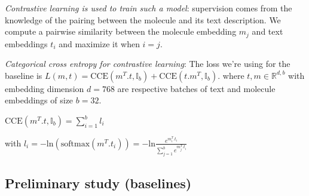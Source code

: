 \textit{Contrastive learning is used to train such a model}: supervision comes from the knowledge of the pairing between the molecule and its text description. We compute a pairwise similarity between the molecule embedding $m_{j}$ and text embeddings $t_{i}$ and maximize it when $i=j$. 

\textit{Categorical cross entropy for contrastive learning}: The loss we're using for the baseline is $L(m, t) = \text{CCE}(m^{T}.t , \mathbb{I}_{b} )+\text{CCE}(t. m^T , \mathbb{I}_{b})$. where $t, m \in \mathbb{R}^{d, b}$ with embedding dimension $d=768$ are respective batches of text and molecule embeddings of size $b=32$.

$\text{CCE}(m^{T}.t , \mathbb{I}_{b}) = \sum_{i=1}^{b} l_{i}$ 

with $l_{i} =-\text{ln}(\text{softmax}(m^{T}.t_{i})) = -\text{ln}\frac{e^{m_{i}^T.t_{i}}}{\sum_{j=1}^{b}e^{m_{j}^T.t_{i}}}$



\subsection*{Preliminary study (baselines)}
\label{sec:preliminary study}

